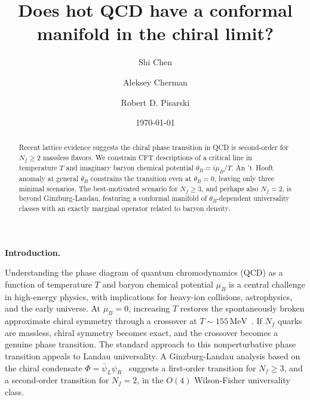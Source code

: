 \documentclass[
 reprint,







nofootinbib,


 amsmath,amssymb,
 aps,
 prd






tightenlines
]{revtex4-2}
\begin{document}
\title{
Does hot QCD have a conformal manifold in the chiral limit?
}

\author{Shi Chen }
\author{Aleksey Cherman }
\author{Robert D. Pisarski }

\date{\today}

\begin{abstract}
Recent lattice evidence suggests the chiral phase transition in QCD is second-order for $N_f \ge 2$ massless flavors. We
constrain CFT descriptions of a critical line in
temperature $T$ and imaginary baryon chemical potential $\theta_B =
i\mu_B/T$. An 't~Hooft anomaly at general $\theta_B$ constrains the
transition even at $\theta_B = 0$, leaving only three minimal scenarios. The
best-motivated scenario for $N_f\ge3$, and perhaps also $N_f = 2$, is beyond
Ginzburg-Landau, featuring a conformal manifold of
$\theta_B$-dependent universality classes with an exactly marginal
operator related to baryon density.
\end{abstract}

\maketitle



{\bf Introduction.}


Understanding the phase diagram of quantum chromodynamics (QCD) as a
function of temperature $T$ and baryon chemical potential $\mu_B$ is a
central challenge in high-energy physics,
with implications for heavy-ion collisions, astrophysics, and the early
universe.
At $\mu_B=0$, increasing $T$ restores the spontaneously broken approximate
chiral symmetry through a crossover at $T \sim 155\,
\textrm{MeV}$~\cite{HotQCD:2018pds,Borsanyi:2020fev}.
If $N_f$ quarks are massless, chiral symmetry becomes exact, and the crossover
becomes a genuine phase transition. The standard approach to this
nonperturbative phase transition appeals to Landau universality. A
Ginzburg-Landau analysis based on the chiral condensate $\Phi = \bar{\psi}_L
\psi_R$~\cite{Pisarski:1983ms} suggests a first-order transition for $N_f\geq3$,
and a second-order transition for $N_f\!=\!2$,
in the $O(4)$ Wilson-Fisher universality class.
\end{document}
